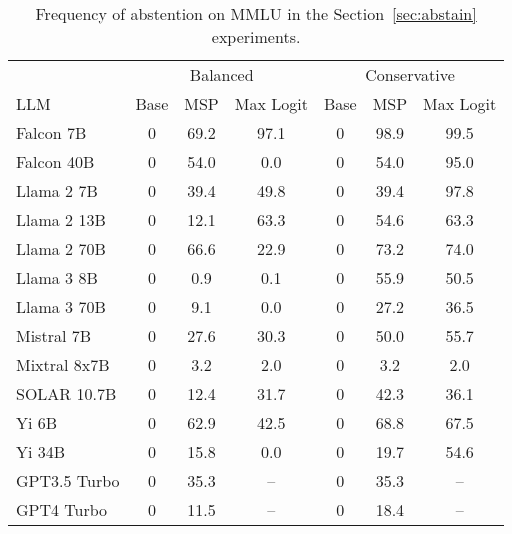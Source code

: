 \begin{table*}[h]
\centering
\caption{Frequency of abstention on MMLU in the Section~\ref{sec:abstain} experiments.}
\label{tab:mmlu_pct_abstained}
\begin{tabular}{lcccccc}
\toprule
& \multicolumn{3}{c}{Balanced} & \multicolumn{3}{c}{Conservative} \\ 
LLM & Base & MSP & Max Logit & Base & MSP & Max Logit \\ 
\cmidrule(lr){1-1}\cmidrule(lr){2-4}\cmidrule(lr){5-7} 
Falcon 7B & 0 & 69.2 & 97.1 & 0 & 98.9 & 99.5\\
Falcon 40B & 0 & 54.0 & 0.0 & 0 & 54.0 & 95.0\\
Llama 2 7B & 0 & 39.4 & 49.8 & 0 & 39.4 & 97.8\\
Llama 2 13B & 0 & 12.1 & 63.3 & 0 & 54.6 & 63.3\\
Llama 2 70B & 0 & 66.6 & 22.9 & 0 & 73.2 & 74.0\\
Llama 3 8B & 0 & 0.9 & 0.1 & 0 & 55.9 & 50.5\\
Llama 3 70B & 0 & 9.1 & 0.0 & 0 & 27.2 & 36.5\\
Mistral 7B & 0 & 27.6 & 30.3 & 0 & 50.0 & 55.7\\
Mixtral 8x7B & 0 & 3.2 & 2.0 & 0 & 3.2 & 2.0\\
SOLAR 10.7B & 0 & 12.4 & 31.7 & 0 & 42.3 & 36.1\\
Yi 6B & 0 & 62.9 & 42.5 & 0 & 68.8 & 67.5\\
Yi 34B & 0 & 15.8 & 0.0 & 0 & 19.7 & 54.6\\
GPT3.5 Turbo & 0 & 35.3 & -- & 0 & 35.3 & --\\
GPT4 Turbo & 0 & 11.5 & -- & 0 & 18.4 & --\\
\bottomrule
\end{tabular}
\end{table*}
